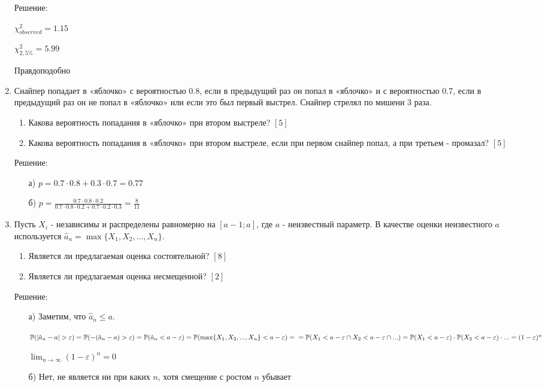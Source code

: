 \documentclass[12pt, a4paper]{article}\usepackage[]{graphicx}\usepackage[]{color}
\begin{document}
\begin{enumerate}
Решение:

$\chi^{2}_{observed}=1.15$

$\chi^{2}_{2,5\%}=5.99$

Правдоподобно

\item Снайпер попадает в «яблочко» с вероятностью 0.8, если в предыдущий раз он попал в «яблочко» и с вероятностью 0.7, если в предыдущий раз он не попал в «яблочко» или если это был первый выстрел. Снайпер стрелял по мишени 3 раза.
\begin{enumerate}
\item Какова вероятность попадания в «яблочко» при втором выстреле? $[5]$
\item Какова вероятность попадания в «яблочко» при втором выстреле, если при первом снайпер попал, а при третьем - промазал? $[5]$
\end{enumerate}
Решение:
\begin{enumerate}
\item[а)] $p=0.7\cdot 0.8+ 0.3\cdot 0.7=0.77$
\item[б)] $p=\frac{0.7\cdot0.8\cdot0.2}{0.7\cdot 0.8\cdot 0.2 + 0.7\cdot 0.2 \cdot 0.3}=\frac{8}{11}$
\end{enumerate}

\item Пусть $X_{i}$ - независимы и распределены равномерно на $[a-1;a]$, где $a$ - неизвестный параметр. В качестве оценки неизвестного $a$ используется $\hat{a}_{n}=\max\{X_{1},X_{2},...,X_{n}\}$.
\begin{enumerate}
\item Является ли предлагаемая оценка состоятельной? $[8]$
\item Является ли предлагаемая оценка несмещенной? $[2]$
\end{enumerate}
Решение:
\begin{enumerate}
\item[а)] Заметим, что $\hat{a}_{n}\leq a$.

$\P(|\hat{a}_{n}-a|>\varepsilon)=\P(-(\hat{a}_{n}-a)>\varepsilon)=\P(\hat{a}_{n}<a-\varepsilon)=\P(\max\{X_{1},X_{2},...,X_{n}\}<a-\varepsilon)= \\
=\P(X_{1}<a-\varepsilon \cap X_{2}< a-\varepsilon\cap ...)=
\P(X_{1}<a-\varepsilon)\cdot \P(X_{2}<a-\varepsilon)\cdot ...=(1-\varepsilon)^{n}$

$\lim_{n\to\infty} (1-\varepsilon)^{n} =0$
\item[б)] Нет, не является ни при каких $n$, хотя смещение с ростом $n$ убывает
\end{enumerate}
\end{enumerate}
\end{document}
